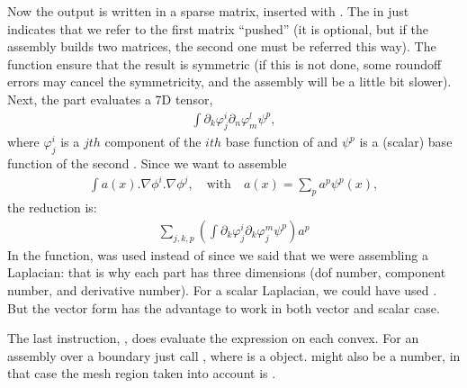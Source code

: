 \documentclass[a4paper,11pt,english]{sphinxmanual}
\begin{document}
Now the output is written in a sparse matrix, inserted with
. The  in  just indicates that we refer
to the first matrix “pushed” (it is optional, but if the assembly builds two
matrices, the second one must be referred this way). The  function ensure
that the result is symmetric (if this is not done, some round\sphinxhyphen{}off errors may
cancel the symmetricity, and the assembly will be a little bit slower). Next, the
 part evaluates a 7D tensor,
\begin{equation*}
\begin{split}\int\partial_k\varphi^{i}_{j}\partial_n\varphi^l_m\psi^p,\end{split}
\end{equation*}
where \(\varphi^i_j\) is a \(jth\) component of the \(ith\) base
function of  and \(\psi^p\) is a (scalar) base function of the second
. Since we want to assemble
\begin{equation*}
\begin{split}\int a(x).\nabla\phi^i.\nabla\phi^j,
\quad\text{with}\quad
a(x)=\sum_p a^p \psi^p(x),\end{split}
\end{equation*}
the reduction is:
\begin{equation*}
\begin{split}\sum_{j,k,p}\left(
\int \partial_k\varphi^{i}_{j} \partial_k\varphi^m_j \psi^p
\right)a^p\end{split}
\end{equation*}
In the  function,  was used instead of  since we said
that we were assembling a  Laplacian: that is why each  part has
three dimensions (dof number, component number, and derivative number). For a
scalar Laplacian, we could have used
. But the vector form has the
advantage to work in both vector and scalar case.

The last instruction, , does evaluate the expression on each
convex. For an assembly over a boundary just call , where
 is a  object.   might also be a number, in that case the mesh
region taken into account is .
\end{document}
